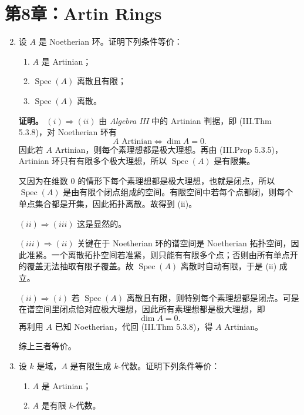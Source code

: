 \documentclass[a4paper]{ctexart}
\begin{document}
\section{第8章：Artin Rings}

\begin{enumerate}[leftmargin=*, label=\textbf{8.\arabic*.}]
\setcounter{enumi}{1}

\item 设 \(A\) 是 Noetherian 环。证明下列条件等价：
\begin{enumerate}[label=(\roman*)]
\item \(A\) 是 Artinian；
\item \(\operatorname{Spec}(A)\) 离散且有限；
\item \(\operatorname{Spec}(A)\) 离散。
\end{enumerate}

\textbf{证明。}
\((i)\Rightarrow(ii)\)\; 由 \textit{Algebra III} 中的 Artinian 判据，即 (III.Thm 5.3.8)，对 Noetherian 环有
\[
A \text{ Artinian}\Longleftrightarrow \dim A=0.
\]
因此若 \(A\) Artinian，则每个素理想都是极大理想。再由 (III.Prop 5.3.5)，Artinian 环只有有限多个极大理想，所以 \(\operatorname{Spec}(A)\) 是有限集。

又因为在维数 \(0\) 的情形下每个素理想都是极大理想，也就是闭点，所以 \(\operatorname{Spec}(A)\) 是由有限个闭点组成的空间。有限空间中若每个点都闭，则每个单点集合都是开集，因此拓扑离散。故得到 (ii)。

\((ii)\Rightarrow(iii)\)\; 这是显然的。

\((iii)\Rightarrow(ii)\)\; 关键在于 Noetherian 环的谱空间是 Noetherian 拓扑空间，因此准紧。一个离散拓扑空间若准紧，则只能有有限多个点；否则由所有单点开的覆盖无法抽取有限子覆盖。故 \(\operatorname{Spec}(A)\) 离散时自动有限，于是 (ii) 成立。

\((ii)\Rightarrow(i)\)\; 若 \(\operatorname{Spec}(A)\) 离散且有限，则特别每个素理想都是闭点。可是在谱空间里闭点恰对应极大理想，因此所有素理想都是极大理想，即
\[
\dim A=0.
\]
再利用 \(A\) 已知 Noetherian，代回 (III.Thm 5.3.8)，得 \(A\) Artinian。

综上三者等价。

\item 设 \(k\) 是域，\(A\) 是有限生成 \(k\)-代数。证明下列条件等价：
\begin{enumerate}[label=(\roman*)]
\item \(A\) 是 Artinian；
\item \(A\) 是有限 \(k\)-代数。
\end{enumerate}


\end{enumerate}
\end{document}
